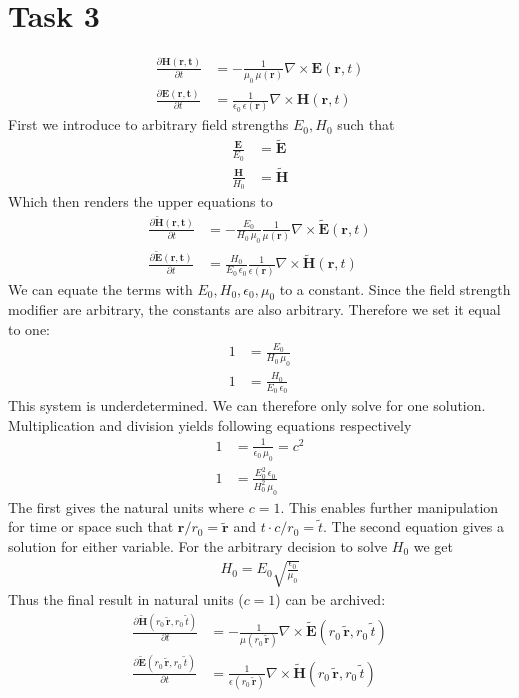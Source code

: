 \documentclass[12pt,a4paper]{article}
\begin{document}
\section*{Task 3}
	\begin{align}
		\frac{\partial \mathbf{H}(\mathbf{r,t})}{\partial t}&=-\frac{1}{\mu_0\,\mu(\mathbf{r})}\nabla\times\mathbf{E}(\mathbf{r},t)\\
		\frac{\partial \mathbf{E}(\mathbf{r,t})}{\partial t}&=\frac{1}{\epsilon_0\,\epsilon(\mathbf{r})}\nabla\times\mathbf{H}(\mathbf{r},t)
	\end{align}
	First we introduce to arbitrary field strengths \(E_0, H_0\) such that
	\begin{align}
		\frac{\mathbf{E}}{E_0}&=\widetilde{\mathbf{E}} \\
		\frac{\mathbf{H}}{H_0}&=\widetilde{\mathbf{H}}
	\end{align}
	Which then renders the upper equations to
	\begin{align}
		\frac{\partial \widetilde{\mathbf{H}}(\mathbf{r,t})}{\partial t}&=-\frac{E_0}{H_0\,\mu_0}\frac{1}{\mu(\mathbf{r})}\nabla\times\widetilde{\mathbf{E}}(\mathbf{r},t)\\
		\frac{\partial \widetilde{\mathbf{E}}(\mathbf{r,t})}{\partial t}&=\frac{H_0}{E_0\,\epsilon_0}\frac{1}{\epsilon(\mathbf{r})}\nabla\times\widetilde{\mathbf{H}}(\mathbf{r},t)
	\end{align}
	We can equate the terms with \(E_0,H_0,\epsilon_0,\mu_0\) to a constant.
	Since the field strength modifier are arbitrary, the constants are also arbitrary.
	Therefore we set it equal to one:
	\begin{align}
		1&=\frac{E_0}{H_0\,\mu_0} \\
		1&=\frac{H_0}{E_0\,\epsilon_0}
	\end{align}
	This system is underdetermined. We can therefore only solve for one solution.
	Multiplication and division yields following equations respectively
	\begin{align}
		1&=\frac{1}{\epsilon_0\,\mu_0}=c^2 \\
		1&=\frac{E_0^2\,\epsilon_0}{H_0^2\,\mu_0}
	\end{align}
	The first gives the natural units where \(c=1\). This enables further manipulation
	for time or space such that \(\mathbf{r}/r_0=\widetilde{\mathbf{r}}\) and
	\(t\cdot c/r_0=\widetilde{t}\). The second equation gives a solution for either variable.
	For the arbitrary decision to solve \(H_0\) we get
	\begin{align}
		H_0=E_0\sqrt{\frac{\epsilon_0}{\mu_0}}
	\end{align}
	Thus the final result in natural units (\(c=1\)) can be archived:
	\begin{align}
		\frac{\partial \widetilde{\mathbf{H}}(r_0\,\widetilde{\mathbf{r}},r_0\,\widetilde{t})}{\partial t}&=-\frac{1}{\mu(r_0\,\widetilde{\mathbf{r}})}\nabla\times\widetilde{\mathbf{E}}(r_0\,\widetilde{\mathbf{r}},r_0\,\widetilde{t})\\
		\frac{\partial \widetilde{\mathbf{E}}(r_0\,\widetilde{\mathbf{r}},r_0\,\widetilde{t})}{\partial t}&=\frac{1}{\epsilon(r_0\,\widetilde{\mathbf{r}})}\nabla\times\widetilde{\mathbf{H}}(r_0\,\widetilde{\mathbf{r}},r_0\,\widetilde{t})
	\end{align}
\end{document}
